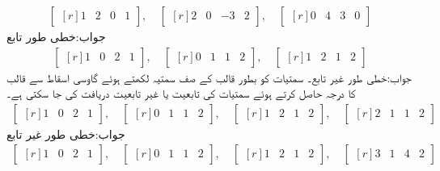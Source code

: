 \begin{align*}
\begin{bmatrix*}[r] 
1&2&0&1
\end{bmatrix*},\quad \begin{bmatrix*}[r] 
2&0&-3&2
\end{bmatrix*},\quad \begin{bmatrix*}[r] 
0&4&3&0
\end{bmatrix*}
\end{align*}
جواب:خطی طور تابع
\begin{align*}
\begin{bmatrix*}[r] 
1&0&2&1
\end{bmatrix*},\quad \begin{bmatrix*}[r] 
0&1&1&2
\end{bmatrix*},\quad \begin{bmatrix*}[r] 
1&2&1&2
\end{bmatrix*}
\end{align*}
جواب:خطی طور غیر تابع۔ سمتیات کو بطور قالب کے صف سمتیہ لکھتے ہوئے گاوسی اسقاط سے قالب کا درجہ حاصل کرتے ہوئے سمتیات کی تابعیت یا غیر تابعیت دریافت کی جا سکتی ہے۔
\begin{align*}
\begin{bmatrix*}[r] 
1&0&2&1
\end{bmatrix*},\quad\begin{bmatrix*}[r] 
0&1&1&2
\end{bmatrix*},\quad\begin{bmatrix*}[r] 
1&2&1&2
\end{bmatrix*},\quad\begin{bmatrix*}[r] 
2&1&1&2
\end{bmatrix*}
\end{align*}
جواب:خطی طور غیر تابع
\begin{align*}
\begin{bmatrix*}[r] 
1&0&2&1
\end{bmatrix*},\quad \begin{bmatrix*}[r] 
0&1&1&2
\end{bmatrix*},\quad \begin{bmatrix*}[r] 
1&2&1&2
\end{bmatrix*},\quad \begin{bmatrix*}[r] 
3&1&4&2
\end{bmatrix*}
\end{align*}

